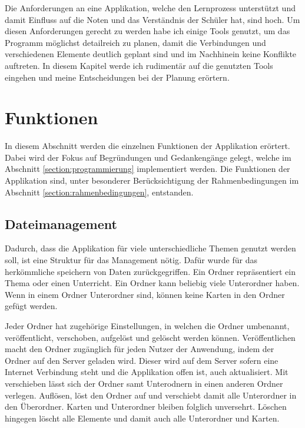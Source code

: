 Die Anforderungen an eine Applikation, welche den Lernprozess unterstützt und damit Einfluss auf die Noten und das Verständnis der Schüler hat, sind hoch. Um diesen Anforderungen gerecht zu werden habe ich einige Tools genutzt, um das Programm möglichst detailreich zu planen, damit die Verbindungen und verschiedenen Elemente deutlich geplant sind und im Nachhinein keine Konflikte auftreten. In diesem Kapitel werde ich rudimentär auf die genutzten Tools eingehen und meine Entscheidungen bei der Planung erörtern.


\section{Funktionen}
In diesem Abschnitt werden die einzelnen Funktionen der Applikation erörtert. Dabei wird der Fokus auf Begründungen und Gedankengänge gelegt, welche im Abschnitt \ref{section:programmierung} implementiert werden. Die Funktionen der Applikation sind, unter besonderer Berücksichtigung der Rahmenbedingungen im Abschnitt \ref{section:rahmenbedingungen}, entstanden.\par

\subsection{Dateimanagement}
Dadurch, dass die Applikation für viele unterschiedliche Themen genutzt werden soll, ist eine Struktur für das Management nötig. Dafür wurde für das herkömmliche speichern von Daten zurückgegriffen. Ein Ordner repräsentiert ein Thema oder einen Unterricht. Ein Ordner kann beliebig viele Unterordner haben. Wenn in einem Ordner Unterordner sind, können keine Karten in den Ordner gefügt werden. 

Jeder Ordner hat zugehörige Einstellungen, in welchen die Ordner umbenannt, veröffentlicht, verschoben, aufgelöst und gelöscht werden können. Veröffentlichen macht den Ordner zugänglich für jeden Nutzer der Anwendung, indem der Ordner auf den Server geladen wird. Dieser wird auf dem Server sofern eine Internet Verbindung steht und die Applikation offen ist, auch aktualisiert. Mit verschieben lässt sich der Ordner samt Unterodnern in einen anderen Ordner verlegen. Auflösen, löst den Ordner auf und verschiebt damit alle Unterordner in den Überordner. Karten und Unterordner bleiben folglich unversehrt. Löschen hingegen löscht alle Elemente und damit auch alle Unterordner und Karten.
